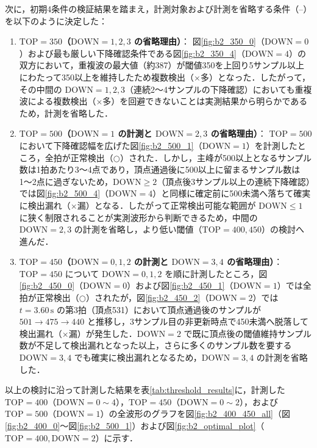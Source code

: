 次に，初期4条件の検証結果を踏まえ，計測対象および計測を省略する条件（--）を以下のように決定した：
\begin{enumerate}
  \item \textbf{$\mathrm{TOP} = 350$（$\mathrm{DOWN} = 1, 2, 3$ の省略理由）}：
        図\ref{fig:b2_350_0}（$\mathrm{DOWN} = 0$）および最も厳しい下降確認条件である図\ref{fig:b2_350_4}（$\mathrm{DOWN} = 4$）の双方において，重複波の最大値（約387）が閾値350を上回り5サンプル以上にわたって350以上を維持したため複数検出（$\times$多）となった．したがって，その中間の $\mathrm{DOWN} = 1, 2, 3$（連続2〜4サンプルの下降確認）においても重複波による複数検出（$\times$多）を回避できないことは実測結果から明らかであるため，計測を省略した．
  \item \textbf{$\mathrm{TOP} = 500$（$\mathrm{DOWN} = 1$ の計測と $\mathrm{DOWN} = 2, 3$ の省略理由）}：
        $\mathrm{TOP} = 500$ において下降確認幅を広げた図\ref{fig:b2_500_1}（$\mathrm{DOWN} = 1$）を計測したところ，全拍が正常検出（$\bigcirc$）された．しかし，主峰が500以上となるサンプル数は1拍あたり3〜4点であり，頂点通過後に500以上に留まるサンプル数は1〜2点に過ぎないため，$\mathrm{DOWN} \ge 2$（頂点後3サンプル以上の連続下降確認）では図\ref{fig:b2_500_4}（$\mathrm{DOWN} = 4$）と同様に確定前に500未満へ落ちて確実に検出漏れ（$\times$漏）となる．したがって正常検出可能な範囲が $\mathrm{DOWN} \le 1$ に狭く制限されることが実測波形から判断できるため，中間の $\mathrm{DOWN} = 2, 3$ の計測を省略し，より低い閾値（$\mathrm{TOP} = 400, 450$）の検討へ進んだ．
  \item \textbf{$\mathrm{TOP} = 450$（$\mathrm{DOWN} = 0, 1, 2$ の計測と $\mathrm{DOWN} = 3, 4$ の省略理由）}：
        $\mathrm{TOP} = 450$ について $\mathrm{DOWN} = 0, 1, 2$ を順に計測したところ，図\ref{fig:b2_450_0}（$\mathrm{DOWN} = 0$）および図\ref{fig:b2_450_1}（$\mathrm{DOWN} = 1$）では全拍が正常検出（$\bigcirc$）されたが，図\ref{fig:b2_450_2}（$\mathrm{DOWN} = 2$）では $t = 3.60\,\mathrm{s}$ の第3拍（頂点531）において頂点通過後のサンプルが $501 \to 475 \to 440$ と推移し，3サンプル目の非更新時点で450未満へ脱落して検出漏れ（$\times$漏）が発生した．$\mathrm{DOWN} = 2$ で既に頂点後の閾値維持サンプル数が不足して検出漏れとなった以上，さらに多くのサンプル数を要する $\mathrm{DOWN} = 3, 4$ でも確実に検出漏れとなるため，$\mathrm{DOWN} = 3, 4$ の計測を省略した．
\end{enumerate}

以上の検討に沿って計測した結果を表\ref{tab:threshold_results}に，計測した $\mathrm{TOP} = 400$（$\mathrm{DOWN} = 0 \sim 4$），$\mathrm{TOP} = 450$（$\mathrm{DOWN} = 0 \sim 2$），および $\mathrm{TOP} = 500$（$\mathrm{DOWN} = 1$）の全波形のグラフを図\ref{fig:b2_400_450_all}（図\ref{fig:b2_400_0}〜図\ref{fig:b2_500_1}）および図\ref{fig:b2_optimal_plot}（$\mathrm{TOP} = 400, \mathrm{DOWN} = 2$）に示す．

